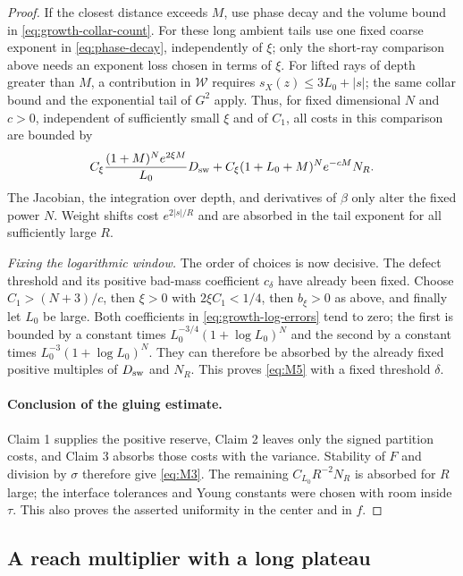 \begin{proof}
If the closest distance exceeds $M$, use phase decay and the volume
bound in \eqref{eq:growth-collar-count}.  For these long ambient tails
use one fixed coarse exponent in \eqref{eq:phase-decay}, independently
of $\xi$; only the short-ray comparison above needs an exponent loss
chosen in terms of $\xi$.  For lifted rays of depth
greater than $M$, a contribution in $\mathcal W$ requires
$s_X(z)\le3L_0+|s|$; the same collar bound and the exponential tail of
$G^2$ apply.  Thus, for fixed dimensional $N$ and $c>0$, independent
of sufficiently small $\xi$ and of $C_1$, all costs in
this comparison are bounded by
\begin{equation}\label{eq:growth-log-errors}
 C_\xi\frac{(1+M)^N e^{2\xi M}}{L_0}D_{\rm sw}
 +C_\xi(1+L_0+M)^N e^{-cM}N_R.
\end{equation}
The Jacobian, the integration over depth, and derivatives of $\beta$
only alter the fixed power $N$.  Weight shifts cost $e^{2|s|/R}$ and
are absorbed in the tail exponent for all sufficiently large $R$.

\emph{Fixing the logarithmic window.}
The order of choices is now decisive.  The defect threshold and its
positive bad-mass coefficient $c_\delta$ have already been fixed.
Choose $C_1>(N+3)/c$, then $\xi>0$ with $2\xi C_1<1/4$, then
$b_\xi>0$ as above, and finally let $L_0$ be large.  Both coefficients
in \eqref{eq:growth-log-errors} tend to zero; the first is bounded by a
constant times $L_0^{-3/4}(1+\log L_0)^N$ and the second by a constant
times $L_0^{-3}(1+\log L_0)^N$.  They can therefore be absorbed by the
already fixed positive multiples of $D_{\rm sw}$ and $N_R$.
This proves \eqref{eq:M5} with a fixed threshold $\delta$.

\paragraph{Conclusion of the gluing estimate.}
Claim 1 supplies the positive reserve, Claim 2 leaves only the signed
partition costs, and Claim 3 absorbs those costs with the variance.
Stability of $F$ and division by $\sigma$ therefore give \eqref{eq:M3}.  The remaining $C_{L_0}R^{-2}N_R$ is
absorbed for $R$ large; the interface tolerances and Young constants
were chosen with room inside $\tau$.  This also proves the asserted
uniformity in the center and in $f$.
\end{proof}

\subsection{A reach multiplier with a long plateau}

